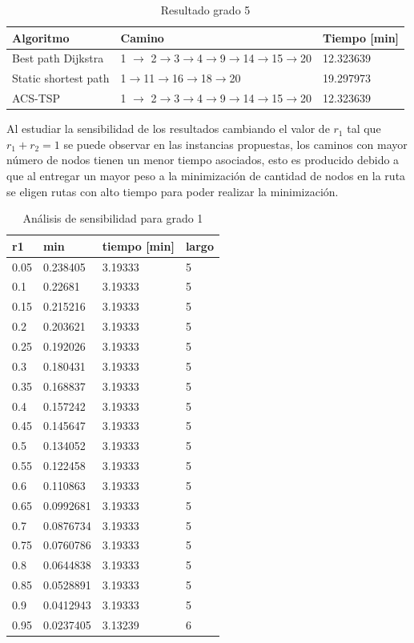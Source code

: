 \documentclass[letter, 10pt]{article}
\begin{document}
\begin{table}[H]
\centering
\begin{tabular}{|l|l|l|}
\hline
Algoritmo            & Camino           & Tiempo {[}min{]} \\ \hline
Best path Dijkstra   & 1 $\rightarrow$ 2$\rightarrow$3$\rightarrow$4$\rightarrow$9$\rightarrow$14$\rightarrow$15$\rightarrow$20 & 12.323639         \\ \hline
Static shortest path & 1$\rightarrow$11$\rightarrow$16$\rightarrow$18$\rightarrow$20    & 19.297973         \\ \hline
ACS-TSP              & 1 $\rightarrow$ 2$\rightarrow$3$\rightarrow$4$\rightarrow$9$\rightarrow$14$\rightarrow$15$\rightarrow$20 & 12.323639         \\ \hline
\end{tabular}
\caption{Resultado grado 5}
\label{res-grade-5}
\end{table}

Al estudiar la sensibilidad de los resultados cambiando el valor de $r_1$ tal que $r_1 + r_2 = 1$ se puede observar en las instancias propuestas, los caminos con mayor número de nodos tienen un menor tiempo asociados, esto es producido debido a que al entregar un mayor peso a la minimización de cantidad de nodos en la ruta se eligen rutas con alto tiempo para poder realizar la minimización.
\begin{table}[H]
\centering
\begin{tabular}{|l|l|l|l|}
\hline
r1 & min & tiempo {[}min{]} & largo \\ \hline
0.05 & 0.238405  & 3.19333 & 5 \\ \hline
0.1  & 0.22681   & 3.19333 & 5 \\ \hline
0.15 & 0.215216  & 3.19333 & 5 \\ \hline
0.2  & 0.203621  & 3.19333 & 5 \\ \hline
0.25 & 0.192026  & 3.19333 & 5 \\\hline
0.3  & 0.180431  & 3.19333 & 5 \\\hline
0.35 & 0.168837  & 3.19333 & 5 \\\hline
0.4  & 0.157242  & 3.19333 & 5 \\\hline
0.45 & 0.145647  & 3.19333 & 5 \\\hline
0.5  & 0.134052  & 3.19333 & 5 \\\hline
0.55 & 0.122458  & 3.19333 & 5 \\\hline
0.6  & 0.110863  & 3.19333 & 5 \\\hline
0.65 & 0.0992681 & 3.19333 & 5 \\\hline
0.7  & 0.0876734 & 3.19333 & 5 \\\hline
0.75 & 0.0760786 & 3.19333 & 5 \\\hline
0.8  & 0.0644838 & 3.19333 & 5 \\\hline
0.85 & 0.0528891 & 3.19333 & 5 \\\hline
0.9  & 0.0412943 & 3.19333 & 5 \\\hline
0.95 & 0.0237405 & 3.13239 & 6 \\\hline
\end{tabular}
\caption{Análisis de sensibilidad para grado 1}
\label{ses-1}
\end{table}
\end{document}
